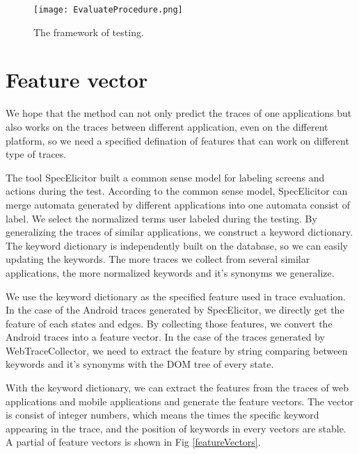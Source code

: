 
\begin{figure}[ht]
	\graphicspath{{pic/}}
	\begin{center}
		\texttt{[image: EvaluateProcedure.png]}
	\end{center}
	\caption{ The framework of testing. }
	\label{EvaluateProcedure}
\end{figure}

\section{Feature vector}

We hope that the method can not only predict the traces of one applications 
but also works on the traces between different application, even on the different platform,
so we need a specified defination of features that can work on different type of traces.

The tool SpecElicitor built a common sense model for labeling screens and actions during the test.
According to the common sense model, 
SpecElicitor can merge automata generated by different applications into one automata consist of label.
We select the normalized terms user labeled during the testing.
By generalizing the traces of similar applications, we construct a keyword dictionary.
The keyword dictionary is independently built on the database,
so we can easily updating the keywords.
The more traces we collect from several similar applications,
the more normalized keywords and it's synonyms we generalize.

We use the keyword dictionary as the specified feature used in trace evaluation.
In the case of the Android traces generated by SpecElicitor,
we directly get the feature of each states and edges.
By collecting those features, we convert the Android traces into a feature vector.
In the case of the traces generated by WebTraceCollector,
we need to extract the feature by string comparing between keywords and it's synonyms with the DOM tree of every state.

With the keyword dictionary, we can extract the features from the traces of web applications and mobile applications
and generate the feature vectors.
The vector is consist of integer numbers, which means the times the specific keyword appearing in the trace,
and the position of keywords in every vectors are stable.
A partial of feature vectors is shown in Fig \ref{featureVectors}.

